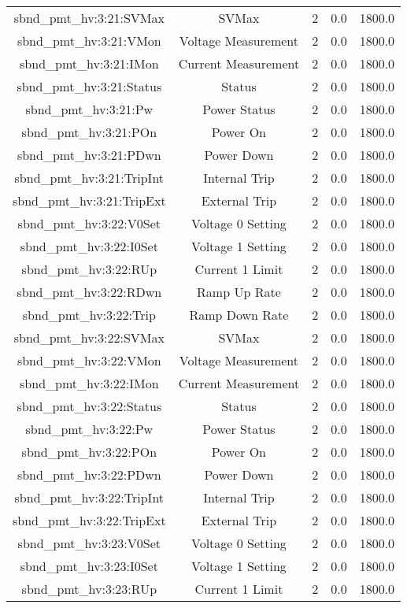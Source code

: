 \begin{center}
\begin{longtable}{c | c c c c }
sbnd\_pmt\_hv:3:21:SVMax & SVMax & 2 & 0.0 & 1800.0\\ 
sbnd\_pmt\_hv:3:21:VMon & Voltage Measurement & 2 & 0.0 & 1800.0\\ 
sbnd\_pmt\_hv:3:21:IMon & Current Measurement & 2 & 0.0 & 1800.0\\ 
sbnd\_pmt\_hv:3:21:Status & Status & 2 & 0.0 & 1800.0\\ 
sbnd\_pmt\_hv:3:21:Pw & Power Status & 2 & 0.0 & 1800.0\\ 
sbnd\_pmt\_hv:3:21:POn & Power On & 2 & 0.0 & 1800.0\\ 
sbnd\_pmt\_hv:3:21:PDwn & Power Down & 2 & 0.0 & 1800.0\\ 
sbnd\_pmt\_hv:3:21:TripInt & Internal Trip & 2 & 0.0 & 1800.0\\ 
sbnd\_pmt\_hv:3:21:TripExt & External Trip & 2 & 0.0 & 1800.0\\ 
sbnd\_pmt\_hv:3:22:V0Set & Voltage 0 Setting & 2 & 0.0 & 1800.0\\ 
sbnd\_pmt\_hv:3:22:I0Set & Voltage 1 Setting & 2 & 0.0 & 1800.0\\ 
sbnd\_pmt\_hv:3:22:RUp & Current 1 Limit & 2 & 0.0 & 1800.0\\ 
sbnd\_pmt\_hv:3:22:RDwn & Ramp Up Rate & 2 & 0.0 & 1800.0\\ 
sbnd\_pmt\_hv:3:22:Trip & Ramp Down Rate & 2 & 0.0 & 1800.0\\ 
sbnd\_pmt\_hv:3:22:SVMax & SVMax & 2 & 0.0 & 1800.0\\ 
sbnd\_pmt\_hv:3:22:VMon & Voltage Measurement & 2 & 0.0 & 1800.0\\ 
sbnd\_pmt\_hv:3:22:IMon & Current Measurement & 2 & 0.0 & 1800.0\\ 
sbnd\_pmt\_hv:3:22:Status & Status & 2 & 0.0 & 1800.0\\ 
sbnd\_pmt\_hv:3:22:Pw & Power Status & 2 & 0.0 & 1800.0\\ 
sbnd\_pmt\_hv:3:22:POn & Power On & 2 & 0.0 & 1800.0\\ 
sbnd\_pmt\_hv:3:22:PDwn & Power Down & 2 & 0.0 & 1800.0\\ 
sbnd\_pmt\_hv:3:22:TripInt & Internal Trip & 2 & 0.0 & 1800.0\\ 
sbnd\_pmt\_hv:3:22:TripExt & External Trip & 2 & 0.0 & 1800.0\\ 
sbnd\_pmt\_hv:3:23:V0Set & Voltage 0 Setting & 2 & 0.0 & 1800.0\\ 
sbnd\_pmt\_hv:3:23:I0Set & Voltage 1 Setting & 2 & 0.0 & 1800.0\\ 
sbnd\_pmt\_hv:3:23:RUp & Current 1 Limit & 2 & 0.0 & 1800.0\\ 

\end{longtable}
\end{center}
